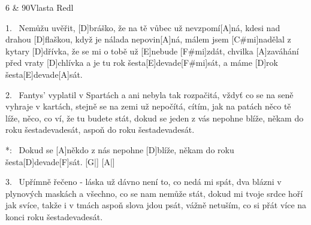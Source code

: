 \begin{song}{6 \& 90}{Vlasta Redl}

\begin{xverse}{1.~}
Nemůžu uvěřit, [\large D]bráško,
že na tě vůbec už nevzpomí[\large A]ná,
kdesi nad drahou [\large D]flaškou,
když je nálada nepovin[\large A]ná,
málem jsem [\large C#mi]nadělal z kytary [\large D]dřívka,
že se mi o tobě už [\large E]nebude [\large F#mi]zdát,
chvilka [\large A]zaváhání před vraty [\large D]chlívka
a je tu rok šesta[\large E]devade[\large F#mi]sát,
a máme [\large D]rok šesta[\large E]devade[\large A]sát.
\end{xverse}

\begin{xverse}{2.~}
Fantys' vyplatil v Spartách
a ani nebyla tak rozpačitá,
vždyť co se na seně vyhraje v kartách,
stejně se na zemi už nepočítá,
cítím, jak na patách něco tě líže,
něco, co ví, že tu budete stát,
dokud se jeden z vás nepohne blíže,
někam do roku šestadevadesát,
aspoň do roku šestadevadesát.
\end{xverse}

\begin{xverse}{*:~}
Dokud se [\large A]někdo z nás nepohne [\large D]blíže,
někam do roku šesta[\large D]devade[\large F]sát. [\large G|]{} [\large A|]{}
\end{xverse}

\begin{xverse}{3.~}
Upřímně řečeno - láska
už dávno není to, co nedá mi spát,
dva blázni v plynových maskách
a všechno, co se nam nemůže stát,
dokud mi tvoje srdce hoří jak svíce,
takže i v tmách aspoň slova jdou psát,
vážně netuším, co si přát více
na konci roku šestadevadesát.
\end{xverse}

\end{song}